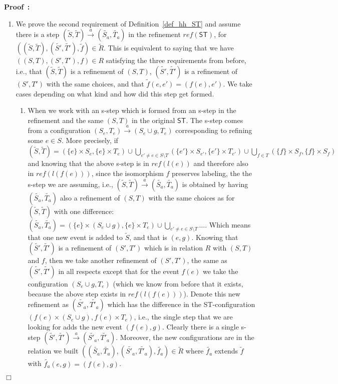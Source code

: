 \documentclass[submission,copyright,creativecommons]{eptcs}
\newenvironment{proof}[1][\!\!\,]{\vspace{1ex}\noindent\textbf{Proof #1: }}{\hfill$\Box$\vspace{2ex}}
\newcounter{case}
\newcommand\ST{\ensuremath{\mathsf{ST}}}
\newcommand\reffun{\ensuremath{\mathit{ref}}}
\newcommand\refinement[1]{\ensuremath{\widetilde{#1}}}
\newcommand{\transition}[1]{\ensuremath{\xrightarrow{#1}}}
\begin{document}
\begin{proof}
\begin{enumerate}
\item We prove the second requirement of Definition~\ref{def_hh_ST} and assume there is a step $(\refinement{S},\refinement{T})\transition{a}(\refinement{S_{a}},\refinement{T_{a}})$ in the refinement $\reffun(\ST)$, for $((\refinement{S},\refinement{T}),(\refinement{S'},\refinement{T'}),\refinement{f})\in\refinement{R}$. This is equivalent to saying that we have $((S,T),(S',T'),f)\in R$ satisfying the three requirements from before, i.e., that $(\refinement{S},\refinement{T})$ is a refinement of $(S,T)$, $(\refinement{S'},\refinement{T'})$ is a refinement of $(S',T')$ with the same choices, and that $\refinement{f}(e,e')=(f(e),e')$.
We take cases depending on what kind and how did this step get formed.
\begin{enumerate}
\item When we work with an s-step which is formed from an s-step in the refinement and the same $(S,T)$ in the original \ST.
The s-step comes from a configuration $(S_{e},T_{e})\transition{a}(S_{e}\cup g,T_{e})$ corresponding to refining some $e\in S$. More precisely, if $(\refinement{S},\refinement{T})=(\{e\}\times S_{e},\{e\}\times T_{e})\cup\bigcup_{e'\neq e\in S\setminus T}(\{e'\}\times S_{e'},\{e'\}\times T_{e'})\cup\bigcup_{f\in T}(\{f\}\times S_{f},\{f\}\times S_{f})$ and knowing that the above s-step is in $\reffun(l(e))$ and therefore also in $\reffun(l(f(e)))$, since the isomorphism $f$ preserves labeling, the the s-step we are assuming, i.e., $(\refinement{S},\refinement{T})\transition{a}(\refinement{S_{a}},\refinement{T_{a}})$ is obtained by having $(\refinement{S_{a}},\refinement{T_{a}})$ also a refinement of $(S,T)$ with the same choices as for $(\refinement{S},\refinement{T})$ with one difference: $(\refinement{S_{a}},\refinement{T_{a}})=(\{e\}\times (S_{e}\cup g),\{e\}\times T_{e})\cup\bigcup_{e'\neq e\in S\setminus T}\dots$. Which means that one new event is added to $\refinement{S}$, and that is $(e,g)$.
Knowing that $(\refinement{S'},\refinement{T'})$ is a refinement of $(S',T')$ which is in relation $R$ with $(S,T)$ and $f$, then we take another refinement of $(S',T')$, the same as $(\refinement{S'},\refinement{T'})$ in all respects except that for the event $f(e)$ we take the configuration $(S_{e}\cup g,T_{e})$ (which we know from before that it exists, because the above step exists in $\reffun(l(f(e)))$). Denote this new refinement as $(\refinement{S'_{a}},\refinement{T'_{a}})$ which has the difference in the ST-configuration $(f(e)\times(S_{e}\cup g),f(e)\times T_{e})$, i.e., the single step that we are looking for adds the new event $(f(e),g)$. Clearly there is a single s-step $(\refinement{S'},\refinement{T'})\transition{a}(\refinement{S'_{a}},\refinement{T'_{a}})$. Moreover, the new configurations are in the relation we built $((\refinement{S_{a}},\refinement{T_{a}}),(\refinement{S'_{a}},\refinement{T'_{a}}),\refinement{f_{a}})\in\refinement{R}$ where $\refinement{f_{a}}$ extends $\refinement{f}$ with $\refinement{f_{a}}(e,g)=(f(e),g)$.

\end{enumerate}
\end{enumerate}
\end{proof}
\end{document}
